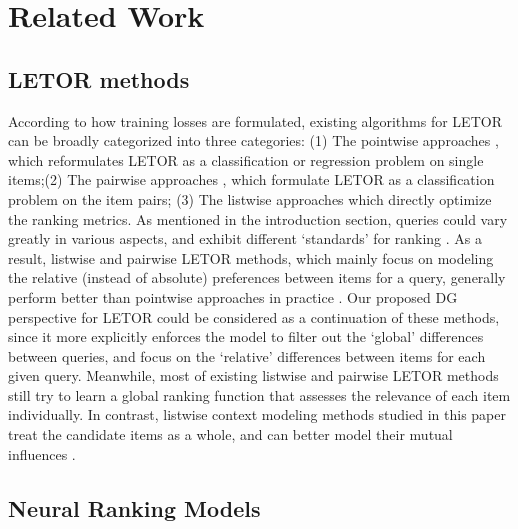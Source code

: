 \documentclass[letterpaper]{article} %
\begin{document}
\section{Related Work}

\subsection{LETOR methods}

According to how training losses are formulated, existing algorithms for LETOR can be broadly categorized into three categories: (1) The pointwise approaches \cite{li2008mcrank,nallapati2004discriminative}, which reformulates LETOR as a classification or regression problem on single items;(2) The pairwise approaches \cite{freund2003efficient,burges2005learning}, which formulate LETOR as a classification problem on the item pairs; (3) The listwise approaches \cite{SoftRank,000278621400005} which directly optimize the ranking metrics. As mentioned in the introduction section, queries could vary greatly in various aspects, and exhibit different `standards' for ranking \cite{sqlrank}. As a result, listwise and pairwise LETOR methods, which mainly focus on modeling the relative (instead of absolute) preferences between items for a query, generally perform better than pointwise approaches in practice \cite{karmaker2017application,cao2007learning,YahooL2R}. Our proposed DG perspective for LETOR could be considered as a continuation of these methods, since it more explicitly enforces the model to filter out the `global' differences between queries, and focus on the `relative' differences between items for each given query. Meanwhile, most of existing listwise and pairwise LETOR methods still try to learn a global ranking function that assesses the relevance of each item individually. In contrast, listwise context modeling methods studied in this paper treat the candidate items as a whole, and can better model their mutual influences \cite{zhuang2018globally}.

\subsection{Neural Ranking Models}
\end{document}
